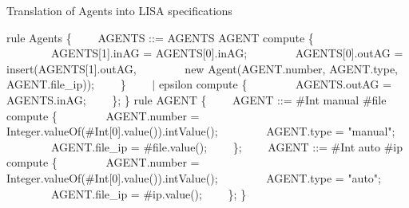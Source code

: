 \documentclass[preprint, prX]{revtex4}
\begin{document}
\begin{algorithm}[tbh]
\caption{Translation of Agents into LISA specifications}
\label{alg:agent_lisa}
\footnotesize
\begin{algorithmic}[1]
\STATE rule Agents \{
\STATE \ \ \ \ AGENTS ::= AGENTS  AGENT compute \{
\STATE \ \ \ \ \ \ \ \ AGENTS[1].inAG = AGENTS[0].inAG;
\STATE \ \ \ \ \ \ \ \ AGENTS[0].outAG = insert(AGENTS[1].outAG,
\STATE \ \ \ \ \ \ \ \ new Agent(AGENT.number, AGENT.type, AGENT.file\_ip));
\STATE \ \ \ \ \}
\STATE \ \ \ \ $|$ epsilon compute \{
\STATE \ \ \ \ \ \ \ \ AGENTS.outAG = AGENTS.inAG;
\STATE \ \ \ \ \};
\STATE \}
\STATE rule AGENT \{
\STATE \ \ \ \ AGENT ::= \#Int manual \#file \; compute \{
\STATE \ \ \ \ \ \ \ \ AGENT.number = Integer.valueOf(\#Int[0].value()).intValue();
\STATE \ \ \ \ \ \ \ \ AGENT.type = "manual";
\STATE \ \ \ \ \ \ \ \ AGENT.file\_ip = \#file.value();
\STATE \ \ \ \ \};
\STATE \ \ \ \ AGENT ::= \#Int auto \#ip \; compute \{
\STATE \ \ \ \ \ \ \ \ AGENT.number = Integer.valueOf(\#Int[0].value()).intValue();
\STATE \ \ \ \ \ \ \ \ AGENT.type = "auto";
\STATE \ \ \ \ \ \ \ \ AGENT.file\_ip = \#ip.value();
\STATE \ \ \ \ \};
\STATE \}
\end{algorithmic}
\normalsize
\end{algorithm}
\end{document}
